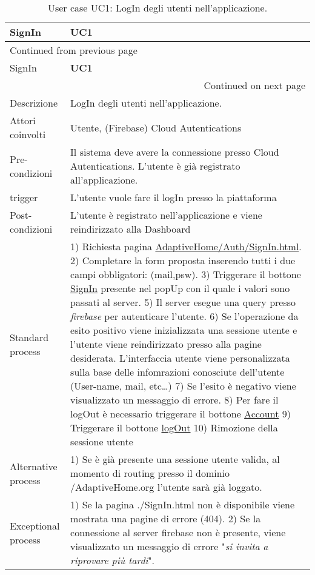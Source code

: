 \documentclass[onecolumn,a4paper]{article}
\begin{document}
\begin{longtable}{|l|p{9.7cm}|}
\caption{User case UC1: LogIn degli utenti nell'applicazione.}
\\
\cellcolor{grey!15}SignIn & \cellcolor{grey!15} \textbf{UC1}\\
\hline
\endfirsthead
\multicolumn{2}{l}{Continued from previous page} \\
\hline

\cellcolor{grey!15}SignIn & \cellcolor{grey!15} \textbf{UC1} \\

\hline
\endhead
\hline\multicolumn{2}{r}{Continued on next page} \\
\endfoot
\endlastfoot
\hline
Descrizione & LogIn degli utenti nell'applicazione.\\
\hline
Attori coinvolti & Utente, (Firebase) Cloud Autentications\\
\hline
Pre-condizioni & Il sistema deve avere la connessione presso Cloud Autentications. L'utente  è già registrato all'applicazione.\\
\hline
trigger & L'utente vuole fare il logIn presso la piattaforma\\
\hline
Post-condizioni & L'utente è registrato nell'applicazione e viene reindirizzato alla Dashboard\\
\hline
Standard process & 1) Richiesta pagina \uline{AdaptiveHome/Auth/SignIn.html}. 2) Completare la form proposta inserendo tutti i due campi obbligatori: (mail,psw). 3) Triggerare il bottone \uline{SignIn} presente nel popUp con il quale i valori sono passati al server. 5) Il server esegue una query presso \emph{firebase} per autenticare l'utente. 6) Se l'operazione da esito positivo viene inizializzata una sessione utente e l'utente viene reindirizzato presso alla pagine desiderata. L'interfaccia utente viene personalizzata sulla base delle infomrazioni conosciute dell'utente (User-name, mail, etc\ldots{}) 7) Se l'esito è negativo viene visualizzato un messaggio di errore. 8) Per fare il logOut è necessario triggerare il bottone \uline{Account} 9) Triggerare il bottone \uline{logOut} 10) Rimozione della sessione utente\\
\hline
Alternative process & 1) Se è già presente una sessione utente valida, al momento di routing presso il dominio /AdaptiveHome.org l'utente sarà già loggato.\\
\hline
Exceptional process & 1) Se la pagina ./SignIn.html non è disponibile viene mostrata una pagine di errore (404). 2) Se la connessione al server firebase non è presente, viene visualizzato un messaggio di errore "\emph{si invita a riprovare più tardi}".\\
\hline
\end{longtable}
\end{document}
